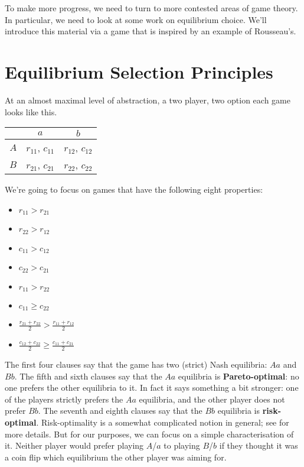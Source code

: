 To make more progress, we need to turn to more contested areas of game theory. In particular, we need to look at some work on equilibrium choice. We'll introduce this material via a game that is inspired by an example of Rousseau's.

\section{Equilibrium Selection Principles}
\label{equilibriumselectionprinciples}

At an almost maximal level of abstraction, a two player, two option each game looks like this.

\begin{center}
\begin{tabular}{r | c c}
& $a$ & $b$ \\\hline
$A$ & $r_{11}$, $c_{11}$ & $r_{12}$, $c_{12}$ \\
$B$ & $r_{21}$, $c_{21}$ & $r_{22}$, $c_{22}$
\end{tabular}
\end{center}
We're going to focus on games that have the following eight properties:

\begin{itemize}
\item $r_{11} > r_{21}$
\item $r_{22} > r_{12}$
\item $c_{11} > c_{12}$
\item $c_{22} > c_{21}$
\item $r_{11} > r_{22}$
\item $c_{11} \geq c_{22}$
\item $\frac{r_{21}+r_{22}}{2} > \frac{r_{11}+r_{12}}{2}$
\item $\frac{c_{12}+c_{22}}{2} \geq \frac{c_{11}+c_{21}}{2}$
\end{itemize}
The first four clauses say that the game has two (strict) Nash equilibria: $Aa$ and $Bb$. The fifth and sixth clauses say that the $Aa$ equilibria is \textbf{Pareto-optimal}: no one prefers the other equilibria to it. In fact it says something a bit stronger: one of the players strictly prefers the $Aa$ equilibria, and the other player does not prefer $Bb$. The seventh and eighth clauses say that the $Bb$ equilibria is \textbf{risk-optimal}. Risk-optimality is a somewhat complicated notion in general; see \citet{HarsanyiSelten1988} for more details. But for our purposes, we can focus on a simple characterisation of it. Neither player would prefer playing $A$\slash $a$ to playing $B$\slash $b$ if they thought it was a coin flip which equilibrium the other player was aiming for.

